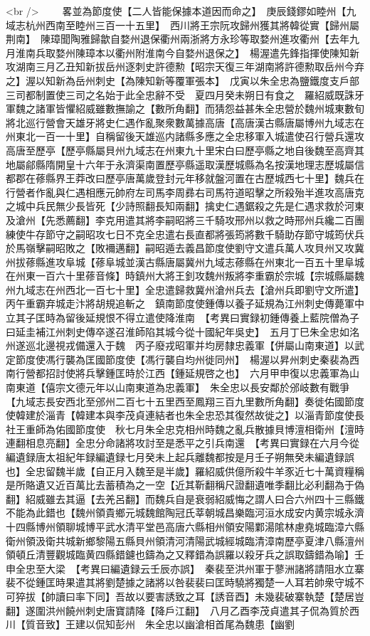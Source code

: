<br />
　　畧並為節度使【二人皆能保據本道因而命之】　庚辰錢鏐如睦州【九域志杭州西南至睦州三百一十五里】　西川將王宗阮攻歸州獲其將韓從實【歸州屬荆南】　陳璋聞陶雅歸歙自婺州退保衢州兩浙將方永珍等取婺州進攻衢州【去年九月淮南兵取婺州陳璋本以衢州附淮南今自婺州退保之】　楊渥遣先鋒指揮使陳知新攻湖南三月乙丑知新拔岳州逐刺史許德勲【昭宗天復三年湖南將許德勲取岳州今弃之】渥以知新為岳州刺史【為陳知新等覆軍張本】　戊寅以朱全忠為鹽鐵度支戶部三司都制置使三司之名始于此全忠辭不受　夏四月癸未朔日有食之　羅紹威既誅牙軍魏之諸軍皆懼紹威雖數撫諭之【數所角翻】而猜怨益甚朱全忠營於魏州城東數旬將北巡行營會天雄牙將史仁遇作亂聚衆數萬據高唐【高唐漢古縣唐屬博州九域志在州東北一百一十里】自稱留後天雄巡内諸縣多應之全忠移軍入城遣使召行營兵還攻高唐至歷亭【歷亭縣屬貝州九域志在州東九十里宋白曰歷亭縣之地自後魏至高齊其地屬鄃縣隋開皇十六年于永濟渠南置歷亭縣遥取漢歷城縣為名按漢地理志歷城屬信都郡在蓚縣界王莽改曰歷亭唐萬歲登封元年移就盤河置在古歷城西七十里】魏兵在行營者作亂與仁遇相應元帥府左司馬李周彞右司馬符道昭擊之所殺殆半進攻高唐克之城中兵民無少長皆死【少詩照翻長知兩翻】擒史仁遇鋸殺之先是仁遇求救於河東及滄州【先悉薦翻】李克用遣其將李嗣昭將三千騎攻邢州以救之時邢州兵纔二百團練使牛存節守之嗣昭攻七日不克全忠遣右長直都將張筠將數千騎助存節守城筠伏兵於馬嶺擊嗣昭敗之【敗襧邁翻】嗣昭遁去義昌節度使劉守文遣兵萬人攻貝州又攻冀州拔蓚縣進攻阜城【蓚阜城並漢古縣唐屬冀州九域志蓚縣在州東北一百五十里阜城在州東一百六十里蓚音條】時鎮州大將王釗攻魏州叛將李重霸於宗城【宗城縣屬魏州九域志在州西北一百七十里】全忠遣歸救冀州滄州兵去【滄州兵即劉守文所遣】丙午重霸弃城走汴將胡規追斬之　鎮南節度使鍾傳以養子延規為江州刺史傳薨軍中立其子匡時為留後延規恨不得立遣使降淮南　【考異曰實録初鍾傳養上藍院僧為子曰延圭補江州刺史傳卒遂召淮師陷其城今從十國紀年吳史】　五月丁巳朱全忠如洺州遂巡北邊視戎備還入于魏　丙子廢戎昭軍并均房隸忠義軍【併屬山南東道】以武定節度使馮行襲為匡國節度使【馮行襲自均州徙同州】　楊渥以昇州刺史秦裴為西南行營都招討使將兵擊鍾匡時於江西【鍾延規啓之也】　六月甲申復以忠義軍為山南東道【僖宗文德元年以山南東道為忠義軍】　朱全忠以長安鄰於邠岐數有戰爭【九域志長安西北至邠州二百七十五里西至鳳翔三百九里數所角翻】奏徙佑國節度使韓建於淄青【韓建本與李茂貞連結者也朱全忠恐其復然故徙之】以淄青節度使長社王重師為佑國節度使　秋七月朱全忠克相州時魏之亂兵散據貝博澶相衛州【澶時連翻相息亮翻】全忠分命諸將攻討至是悉平之引兵南還　【考異曰實録在六月今從編遺録唐太祖紀年録編遺録七月癸未上起兵離魏都按是月壬子朔無癸未編遺録誤也】全忠留魏半歲【自正月入魏至是半歲】羅紹威供億所殺牛羊豕近七十萬資糧稱是所賂遺又近百萬比去蓄積為之一空【近其靳翻稱尺證翻遺唯季翻比必利翻為于偽翻】紹威雖去其逼【去羌呂翻】而魏兵自是衰弱紹威悔之謂人曰合六州四十三縣鐵不能為此錯也【魏州領貴鄉元城魏館陶冠氏莘朝城昌樂臨河洹水成安内黄宗城永濟十四縣博州領聊城博平武水清平堂邑高唐六縣相州領安陽鄴湯隂林慮堯城臨漳六縣衛州領汲衛共城新鄉黎陽五縣貝州領清河清陽武城經城臨清漳南歷亭夏津八縣澶州領頓丘清豐觀城臨黄四縣錯鑢也鑄為之又釋錯為誤羅以殺牙兵之誤取鑄錯為喻】壬申全忠至大梁　【考異曰編遺録云壬辰亦誤】　秦裴至洪州軍于蓼洲諸將請阻水立寨裴不從鍾匡時果遣其將劉楚據之諸將以咎裴裴曰匡時驍將獨楚一人耳若帥衆守城不可猝拔【帥讀曰率下同】吾故以要害誘致之耳【誘音酉】未幾裴破寨執楚【楚居豈翻】遂圍洪州饒州刺史唐寶請降【降戶江翻】　八月乙酉李茂貞遣其子侃為質於西川【質音致】王建以侃知彭州　朱全忠以幽滄相首尾為魏患【幽劉